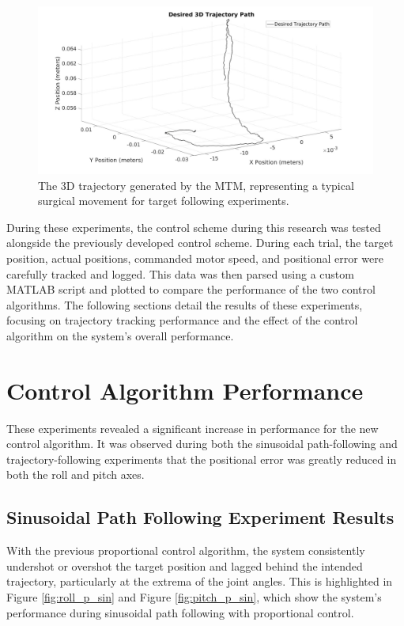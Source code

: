 \begin{figure}[H]
    \centering
    \includegraphics[width=1.0\linewidth]{figures/desired_trajectory.jpg}
    \caption{The 3D trajectory generated by the MTM, representing a typical surgical movement for target following experiments.}
    \label{fig:desired_trajectory}
\end{figure}

During these experiments, the control scheme during this research was tested alongside the previously developed control scheme. During each trial, the target position, actual positions, commanded motor speed, and positional error were carefully tracked and logged. This data was then parsed using a custom MATLAB script and plotted to compare the performance of the two control algorithms. The following sections detail the results of these experiments, focusing on trajectory tracking performance and the effect of the control algorithm on the system's overall performance.

\section{Control Algorithm Performance}
\label{section:trajectory_performance}

These experiments revealed a significant increase in performance for the new control algorithm. It was observed during both the sinusoidal path-following and trajectory-following experiments that the positional error was greatly reduced in both the roll and pitch axes. 

\subsection{Sinusoidal Path Following Experiment Results}

With the previous proportional control algorithm, the system consistently undershot or overshot the target position and lagged behind the intended trajectory, particularly at the extrema of the joint angles. This is highlighted in Figure \ref{fig:roll_p_sin} and Figure \ref{fig:pitch_p_sin}, which show the system's performance during sinusoidal path following with proportional control.

